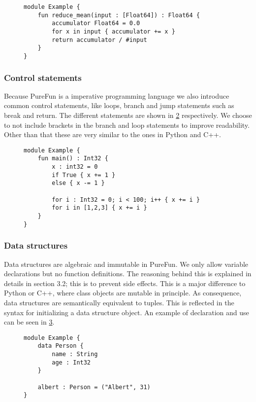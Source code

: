 \begin{figure}
	\label{lst:simple_ex}\begin{lstlisting}[caption={A simple example calculating the mean for a sequence of double precision floating point values in PureFun.}]
module Example {
	fun reduce_mean(input : [Float64]) : Float64 {
		accumulator Float64 = 0.0
		for x in input { accumulator += x }
		return accumulator / #input
	}
}
	\end{lstlisting}
\end{figure} 

\subsubsection{Control statements} Because PureFun is a imperative programming language we also introduce common control statements, like loops, branch and jump statements such as break and return. The different statements are shown in \ref{lst:ex_flow} respectively. We choose to not include brackets in the branch and loop statements to improve readability. Other than that these are very similar to the ones in Python and C++.

\begin{figure}
	\label{lst:ex_flow}\begin{lstlisting}[caption={Some examples of control statements in PureFun}]
module Example {
	fun main() : Int32 {
		x : int32 = 0
		if True { x += 1 }
		else { x -= 1 }
		
		for i : Int32 = 0; i < 100; i++ { x += i }
		for i in [1,2,3] { x += i }
	}
}
	\end{lstlisting}
\end{figure}

\subsubsection{Data structures} Data structures are algebraic and immutable in PureFun. We only allow variable declarations but no function definitions. The reasoning behind this is explained in details in section 3.2; this is to prevent side effects. This is a major difference to Python or C++, where class objects are mutable in principle. As consequence, data structures are semantically equivalent to tuples. This is reflected in the syntax for initializing a data structure object. An example of declaration and use can be seen in \ref{lst:data}.

\begin{figure}
	\label{lst:data}\begin{lstlisting}[caption={Simple example of declaration and use of user defined data structures.}]
module Example {
	data Person {
		name : String
		age : Int32
	}
	
	albert : Person = ("Albert", 31)
}
	\end{lstlisting}
\end{figure}

